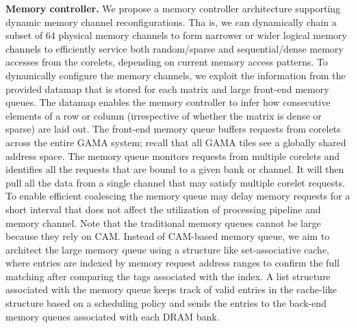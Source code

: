 \vspace{3pt}
\noindent
\textbf{Memory controller.} 
We propose a memory controller architecture supporting dynamic memory channel reconfigurations.
Tha is, we can dynamically chain a subset of 64 physical memory channels to form narrower or wider logical memory channels to efficiently service both random/sparse and sequential/dense memory accesses from the corelets, depending on current memory access patterns. 
To dynamically configure the memory channels, we exploit the information from the provided datamap that is stored for each matrix and large front-end memory queues. 
The datamap enables the memory controller to infer how consecutive elements of a row or column (irrespective of whether the matrix is dense or sparse) are laid out. 
The front-end memory queue buffers requests from corelets across the entire GAMA system; recall that all GAMA tiles see a globally shared address space. 
The memory queue monitors requests from multiple corelets and identifies all the requests that are bound to a given bank or channel. 
It will then pull all the data from a single channel that may satisfy multiple corelet requests.  
To enable efficient coalescing the memory queue may delay memory requests for a short interval that does not affect the utilization of processing pipeline and memory channel. 
Note that the traditional memory queues cannot be large because they rely on CAM.
Instead of CAM-based memory queue, we aim to architect the large memory queue using a structure like set-associative cache, where entries are indexed by memory request address ranges to confirm the full matching after comparing the tags associated with the index.
A list structure associated with the memory queue keeps track of valid entries in the cache-like structure based on a scheduling policy and sends the entries to the back-end memory queues associated with each DRAM bank.


 
